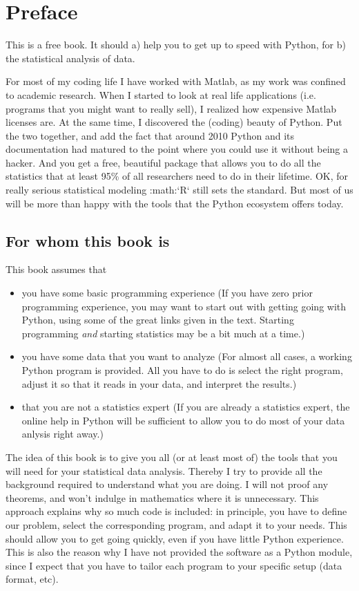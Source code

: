\chapter*{Preface}

This is a free book. It should a) help you to get up to speed with
Python, for b) the statistical analysis of data.

For most of my coding life I have worked with Matlab, as my work was
confined to academic research. When I started to look at real life
applications (i.e. programs that you might want to really sell), I
realized how expensive Matlab licenses are. At the same time, I
discovered the (coding) beauty of Python. Put the two together, and add
the fact that around 2010 Python and its documentation had matured to
the point where you could use it without being a hacker. And you get a
free, beautiful package that allows you to do all the statistics that at
least 95\% of all researchers need to do in their lifetime. OK, for
really serious statistical modeling :math:`R` still sets the standard.
But most of us will be more than happy with the tools that the Python
ecosystem offers today.

\section*{For whom this book is}

This book assumes that

\begin{itemize}
  \item you have some basic programming experience (If you have zero prior programming experience, you may want to start out with getting going with Python, using some of the great links given in the text. Starting programming \emph{and} starting statistics may be a bit much at a time.)
  \item you have some data that you want to analyze (For almost all cases, a working Python program is provided. All you have to do is select the right program, adjust it so that it reads in your data, and interpret the results.)
  \item that you are not a statistics expert (If you are already a statistics expert, the online help in Python will be sufficient to allow you to do most of your data anlysis right away.)
\end{itemize}


The idea of this book is to give you all (or at least most of) the tools
that you will need for your statistical data analysis. Thereby I try to
provide all the background required to understand what you are doing. I
will not proof any theorems, and won't indulge in mathematics where it
is unnecessary. This approach explains why so much code is included: in
principle, you have to define our problem, select the corresponding
program, and adapt it to your needs. This should allow you to get going
quickly, even if you have little Python experience. This is also the
reason why I have not provided the software as a Python module, since I
expect that you have to tailor each program to your specific setup (data
format, etc).

